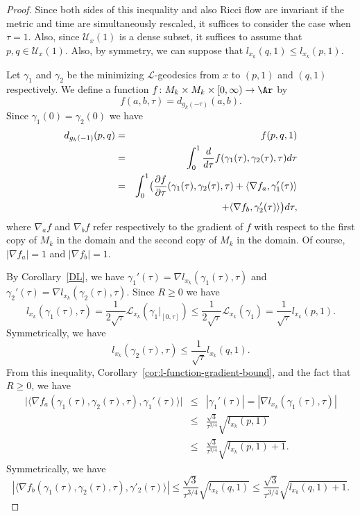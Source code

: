 \begin{proof}
Since both sides of this inequality and also Ricci flow are
invariant if the metric and time are simultaneously rescaled, it
suffices to consider the case when $\tau=1$. Also, since ${\mathcal
U}_x(1)$ is a dense subset, it suffices to assume that $p,q\in
{\mathcal U}_x(1)$. Also, by symmetry, we can suppose that
$l_{x_k}(q,1)\le l_{x_k}(p,1)$.

 Let
$\gamma_1$ and $\gamma_2$ be the minimizing ${\mathcal L}$-geodesics
from $x$ to $(p,1)$ and $(q,1)$ respectively. We define a function
$f\colon M_k\times M_k\times [0,\infty)\to \Ar$ by
$$f(a,b,\tau)=d_{g_k(-\tau)}(a,b).$$
Since $\gamma_1(0)=\gamma_2(0)$ we have
\begin{eqnarray}\nonumber
d_{g_k(-1)}(p,q) & = & f(p,q,1) \\ \nonumber & =&
\int_0^1\frac{d}{d\tau}f(\gamma_1(\tau),\gamma_2(\tau),\tau)d\tau \\
\nonumber & = & \int_0^1\bigl(\frac{\partial f}{\partial
\tau}(\gamma_1(\tau),\gamma_2(\tau),\tau)+\langle \nabla
f_a,\gamma_1'(\tau)\rangle\bigr. \\
\label{fform} & & \hskip.2in+\bigl.\langle \nabla
f_b,\gamma_2'(\tau)\rangle\bigr)d\tau,
\end{eqnarray}
where $\nabla_af$ and $\nabla_bf$ refer respectively to  the
gradient of $f$ with respect to the first copy of $M_k$ in the
domain and the second copy of $M_k$ in the domain. Of course,
$|\nabla f_a|=1$ and $|\nabla f_b|=1$.

By Corollary~\ref{DL}, we have $\gamma_1'(\tau)=\nabla
l_{x_k}(\gamma_1(\tau),\tau)$ and $\gamma_2'(\tau)=\nabla
l_{x_k}(\gamma_2(\tau),\tau)$. Since $R\ge 0$ we have
$$l_{x_k}(\gamma_1(\tau),\tau)=\frac{1}{2\sqrt{\tau}}{\mathcal
L}_{x_k}(\gamma_1|_{[0,\tau]})\le \frac{1}{2\sqrt{\tau}}{\mathcal
L}_{x_k}(\gamma_1)=\frac{1}{\sqrt{\tau}}l_{x_k}(p,1).$$
Symmetrically, we have
$$l_{x_k}(\gamma_2(\tau),\tau)\le \frac{1}{\sqrt{\tau}}l_{x_k}(q,1).$$
From this inequality, Corollary~\ref{cor:l-function-gradient-bound}, and the fact that
$R\ge 0$, we have
\begin{eqnarray}\nonumber \bigl|\langle \nabla
f_a(\gamma_1(\tau),\gamma_2(\tau),\tau),\gamma_1'(\tau)\rangle
\bigr|& \le &
|\gamma_1'(\tau)| =|\nabla l_{x_k}(\gamma_1(\tau),\tau) | \nonumber \\
& \le &
\frac{\sqrt{3}}{\tau^{3/4}}\sqrt{l_{x_k}(p,1)}  \nonumber \\
& \le &
\frac{\sqrt{3}}{\tau^{3/4}}\sqrt{l_{x_k}(p,1)+1}.\label{1eqn}\end{eqnarray}
Symmetrically, we have \begin{equation}\label{2eqn} \left|\langle
\nabla
f_b(\gamma_1(\tau),\gamma_2(\tau),\tau),\gamma'_2(\tau)\rangle\right|\le
\frac{\sqrt{3}}{\tau^{3/4}}\sqrt{l_{x_k}(q,1)}\le
\frac{\sqrt{3}}{\tau^{3/4}}\sqrt{l_{x_k}(q,1)+1}.\end{equation}



\end{proof}

